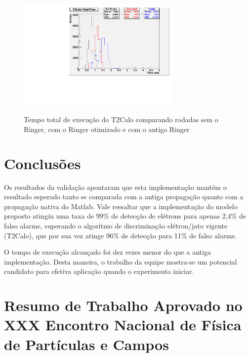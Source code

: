 \documentclass[a4paper,10pt,titlepage]{article}
\begin{document}
\begin{figure}[htbp!]
 \centering
 \includegraphics[width=8cm,height=6cm]{Figs/egamma_refactoring/egamma_ringer_time_optimization.pdf}
 \caption{Tempo total de execução do T2Calo comparando rodadas sem o Ringer, com o Ringer otimizado e com o antigo Ringer}
 \label{fig:egamma_ringer_time_optimization}
\end{figure}

\section{Conclusões}

Os resultados da validação apontaram que esta implementação mantém o resultado esperado tanto se comparada com a antiga propagação quanto com a propagação nativa do Matlab.
Vale ressaltar que a implementação do modelo proposto atingiu uma taxa de 99\% de detecção de elétrons para apenas 2,4\% de falso alarme, superando o algoritmo de discriminação elétron/jato vigente (T2Calo), que por sua vez atinge 96\% de detecção para 11\% de falso alarme.

O tempo de execução alcançado foi dez vezes menor do que a antiga implementação.
Desta maneira, o trabalho da equipe mostra-se um potencial candidato para efetiva aplicação quando o experimento iniciar.

\pagebreak

%
%

\appendix

\section{Resumo de Trabalho Aprovado no XXX Encontro Nacional de Física de Partículas e Campos}
\end{document}
